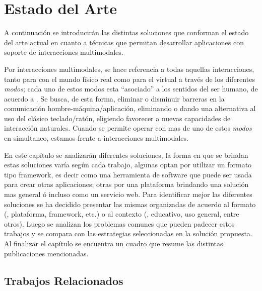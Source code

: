
\chapter{Estado del Arte} %

\label{ch:estado_arte} %



A continuación se introducirán las distintas soluciones que conforman el estado del arte actual en cuanto a técnicas que permitan desarrollar aplicaciones con soporte de interacciones multimodales.

Por interacciones multimodales, se hace referencia a todas aquellas interacciones, tanto para con el mundo físico real como para el virtual a través de los diferentes \emph{modos}; cada uno de estos modos esta ``asociado'' a los sentidos del ser humano, de acuerdo a \citet{Bourguet2003}. Se busca, de esta forma, eliminar o disminuir barreras en la comunicación hombre-máquina/aplicación, \eg eliminando o dando una alternativa al uso del clásico teclado/ratón, eligiendo favorecer a nuevas capacidades de interacción naturales.
Cuando se permite operar con mas de uno de estos \emph{modos} en simultaneo, estamos frente a interacciones multimodales.

En este capítulo se analizarán diferentes soluciones, la forma en que se brindan estas soluciones varía según cada trabajo, algunas optan por utilizar un formato tipo framework, es decir como una herramienta de software que puede ser usada para crear otras aplicaciones; otras por una plataforma brindando una solución mas general ó incluso como un servicio web. Para identificar mejor las diferentes soluciones se ha decidido presentar las mismas organizadas de acuerdo al formato (\ie, plataforma, framework, etc.) o al contexto (\ie, educativo, uso general, entre otros). 
Luego se analizan los problemas comunes que pueden padecer estos trabajos y se compara con las estrategias seleccionadas en la solución propuesta. 
Al finalizar el capítulo se encuentra un cuadro que resume las distintas publicaciones mencionadas.


\section{Trabajos Relacionados} \label{sec:related_work} %

